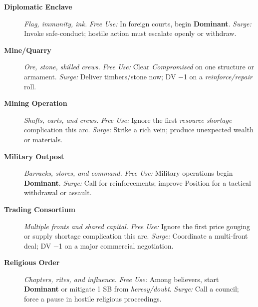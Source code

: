 \begin{description}
  \item[\textbf{Diplomatic Enclave}]  \emph{Flag, immunity, ink.} \emph{Free Use:} In foreign courts, begin \textbf{Dominant}. \emph{Surge:} Invoke safe-conduct; hostile action must escalate openly or withdraw.

  \item[\textbf{Mine/Quarry}]  \emph{Ore, stone, skilled crews.} \emph{Free Use:} Clear \emph{Compromised} on one structure or armament. \emph{Surge:} Deliver timbers/stone now; DV −1 on a \emph{reinforce/repair} roll.

  \item[\textbf{Mining Operation}]  \emph{Shafts, carts, and crews.} \emph{Free Use:} Ignore the first \emph{resource shortage} complication this arc. \emph{Surge:} Strike a rich vein; produce unexpected wealth or materials.

  \item[\textbf{Military Outpost}]  \emph{Barracks, stores, and command.} \emph{Free Use:} Military operations begin \textbf{Dominant}. \emph{Surge:} Call for reinforcements; improve Position for a tactical withdrawal or assault.

  \item[\textbf{Trading Consortium}]  \emph{Multiple fronts and shared capital.} \emph{Free Use:} Ignore the first price gouging or supply shortage complication this arc. \emph{Surge:} Coordinate a multi-front deal; DV −1 on a major commercial negotiation.

  \item[\textbf{Religious Order}]  \emph{Chapters, rites, and influence.} \emph{Free Use:} Among believers, start \textbf{Dominant} or mitigate 1 SB from \emph{heresy/doubt}. \emph{Surge:} Call a council; force a pause in hostile religious proceedings.
\end{description}

